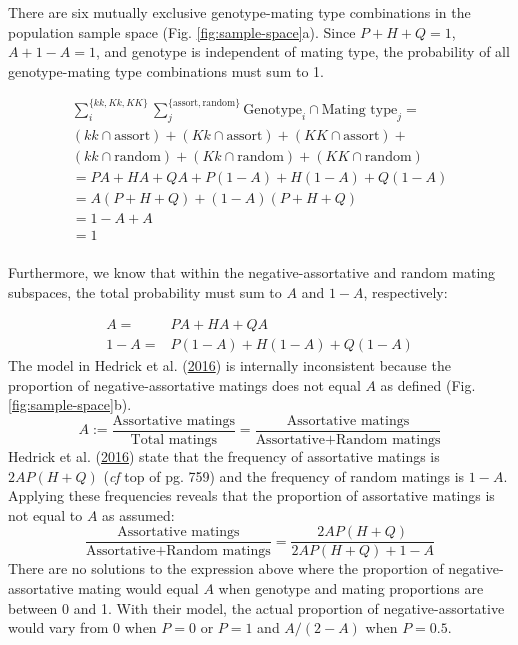 \documentclass[
]{article}
\begin{document}
There are six mutually exclusive genotype-mating type combinations in the population sample space (Fig. \ref{fig:sample-space}a). Since \(P+H+Q=1\), \(A + 1 - A = 1\), and genotype is independent of mating type, the probability of all genotype-mating type combinations must sum to 1.

\begin{multline*}
 \sum_i^{\{\mathit{kk}, \mathit{Kk}, \mathit{KK}\}} \sum_j^{\{\textrm{assort}, \textrm{random}\}} \textrm{Genotype}_i \cap \textrm{Mating~type}_j = \\  
  (\mathit{kk} \cap \textrm{assort}) + (\mathit{Kk} \cap \textrm{assort}) + 
  (\mathit{KK} \cap \textrm{assort}) + \\ (\mathit{kk} \cap \textrm{random}) + 
  (\mathit{Kk} \cap \textrm{random}) + (\mathit{KK} \cap \textrm{random}) \\
 = PA + HA + QA + P (1 - A) + H (1 - A) + Q (1 - A) \\
 = A (P + H + Q) + (1 - A) (P + H + Q) \\
 = 1 - A + A \\
 = 1 \\
\end{multline*}

Furthermore, we know that within the negative-assortative and random mating subspaces, the total probability must sum to \(A\) and \(1 - A\), respectively:

\begin{align*}
  A = & PA + HA + QA \\
  1 - A = & P (1 - A) + H (1 - A) + Q (1 - A)
\end{align*}
The model in Hedrick et al. (\protect\hyperlink{ref-hedrick_negative-assortative_2016}{2016}) is internally inconsistent because the proportion of negative-assortative matings does not equal \(A\) as defined (Fig. \ref{fig:sample-space}b).
\[A := \frac{\textrm{Assortative matings}}{\textrm{Total matings}} =\frac{\textrm{Assortative matings}}{\textrm{Assortative} + \textrm{Random matings}}\]
Hedrick et al. (\protect\hyperlink{ref-hedrick_negative-assortative_2016}{2016}) state that the frequency of assortative matings is \(2 A P (H + Q)\) (\emph{cf} top of pg. 759) and the frequency of random matings is \(1 - A\). Applying these frequencies reveals that the proportion of assortative matings is not equal to \(A\) as assumed:
\[ \frac{\textrm{Assortative matings}}{\textrm{Assortative} + \textrm{Random matings}} = \frac{2 A P (H + Q)}{2 A P (H + Q) + 1 - A}\]
There are no solutions to the expression above where the proportion of negative-assortative mating would equal \(A\) when genotype and mating proportions are between 0 and 1. With their model, the actual proportion of negative-assortative would vary from 0 when \(P = 0\) or \(P = 1\) and \(A / (2 - A)\) when \(P = 0.5\).
\end{document}
